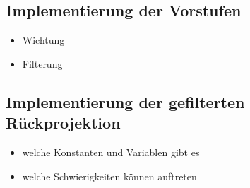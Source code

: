\subsection{Implementierung der Vorstufen}

\begin{itemize}
    \item Wichtung
    \item Filterung
\end{itemize}

\subsection{Implementierung der gefilterten Rückprojektion}

\begin{itemize}
    \item welche Konstanten und Variablen gibt es
    \item welche Schwierigkeiten können auftreten
\end{itemize}
